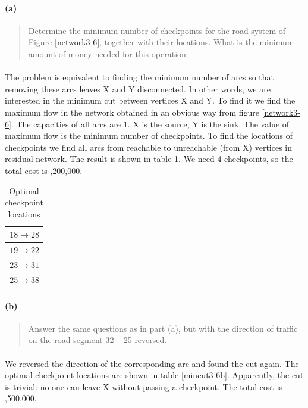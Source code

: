 \paragraph{(a)}
\begin{quote}
Determine the minimum number of checkpoints for the road system of Figure \ref{network3-6}, together with their locations. What is the minimum amount of money needed for this operation.
\end{quote}

\paragraph{}
The problem is equivalent to finding the minimum number of arcs so that removing these arcs leaves X and Y disconnected. In other words, we are interested in the minimum cut between vertices X and Y. To find it we find the maximum flow in the network obtained in an obvious way from figure \ref{network3-6}. The capacities of all arcs are 1. X is the source, Y is the sink. The value of maximum flow is the minimum number of checkpoints. To find the locations of checkpoints we find all arcs from reachable to unreachable (from X) vertices in residual network. The result is shown in table \ref{mincut3-6a}. We need 4 checkpoints, so the total cost is ,200,000.

\begin{table}[H]
\centering
\begin{tabular}{|r|}
\hline
$18 \rightarrow 28$ \\ \hline
$19 \rightarrow 22$ \\ \hline
$23 \rightarrow 31$ \\ \hline
$25 \rightarrow 38$ \\ \hline
\end{tabular}
\caption{Optimal checkpoint locations}
\label{mincut3-6a}
\end{table}

\paragraph{(b)}
\begin{quote}
Answer the same questions as in part (a), but with the direction of traffic on the road segment 32 – 25 reversed.
\end{quote}

\paragraph{}
We reversed the direction of the corresponding arc and found the cut again. The optimal checkpoint locations are shown in table \ref{mincut3-6b}. Apparently, the cut is trivial: no one can leave X without passing a checkpoint. The total cost is ,500,000.

